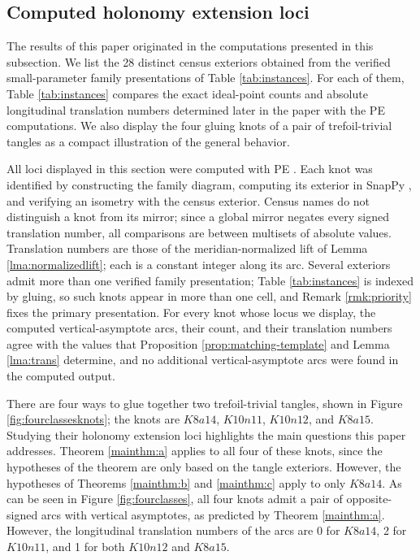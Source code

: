 \documentclass{article}
\theoremstyle{plain}
\theoremstyle{definition}
\theoremstyle{plain}
\theoremstyle{plain}
\theoremstyle{plain}
\theoremstyle{remark}
\theoremstyle{remark}
\theoremstyle{plain}
\theoremstyle{plain}
\newcounter{main}
\theoremstyle{plain}
\theoremstyle{plain}
\begin{document}
\subsection{Computed holonomy extension loci}

The results of this paper originated in the computations presented in this subsection. We list the 28 distinct census exteriors obtained from the verified small-parameter family presentations of Table \ref{tab:instances}. For each of them, Table \ref{tab:instances} compares the exact ideal-point counts and absolute longitudinal translation numbers determined later in the paper with the PE computations. We also display the four gluing knots of a pair of trefoil-trivial tangles as a compact illustration of the general behavior. 

\medskip

All loci displayed in this section were computed with PE \cite{CullerDunfieldPE}. Each knot was identified by constructing the family diagram, computing its exterior in SnapPy \cite{SnapPy}, and verifying an isometry with the census exterior. Census names do not distinguish a knot from its mirror; since a global mirror negates every signed translation number, all comparisons are between multisets of absolute values. Translation numbers are those of the meridian-normalized lift of Lemma \ref{lma:normalizedlift}; each is a constant integer along its arc. Several exteriors admit more than one verified family presentation; Table \ref{tab:instances} is indexed by gluing, so such knots appear in more than one cell, and Remark \ref{rmk:priority} fixes the primary presentation. For every knot whose locus we display, the computed vertical-asymptote arcs, their count, and their translation numbers agree with the values that Proposition \ref{prop:matching-template} and Lemma \ref{lma:trans} determine, and no additional vertical-asymptote arcs were found in the computed output.

\medskip

There are four ways to glue together two trefoil-trivial tangles, shown in Figure \ref{fig:fourclassesknots}; the knots are $K8a14$, $K10n11$, $K10n12$, and $K8a15$. Studying their holonomy extension loci highlights the main questions this paper addresses. Theorem \ref{mainthm:a} applies to all four of these knots, since the hypotheses of the theorem are only based on the tangle exteriors. However, the hypotheses of Theorems \ref{mainthm:b} and \ref{mainthm:c} apply to only $K8a14$. As can be seen in Figure \ref{fig:fourclasses}, all four knots admit a pair of opposite-signed arcs with vertical asymptotes, as predicted by Theorem \ref{mainthm:a}. However, the longitudinal translation numbers of the arcs are 0 for $K8a14$, 2 for $K10n11$, and 1 for both $K10n12$ and $K8a15$. 
\end{document}
